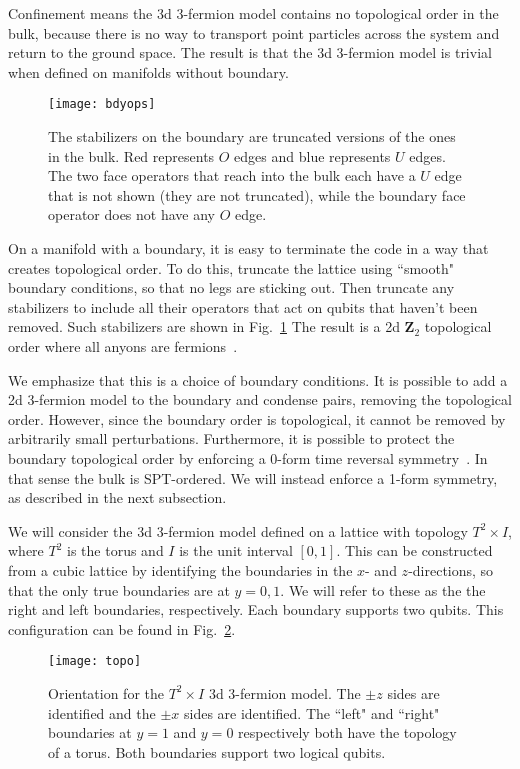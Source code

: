 Confinement means the 3d 3-fermion model contains no topological order in the bulk, because there is no way to transport point particles across the system and return to the ground space. The result is that the 3d 3-fermion model is trivial when defined on manifolds without boundary.

\begin{figure}[th!]
\centering
\texttt{[image: bdyops]}
\caption[Stabilizers on the boundary of the Walker-Wang model]{The stabilizers on the boundary are truncated versions of the ones in the bulk. Red represents $O$ edges and blue represents $U$ edges. The two face operators that reach into the bulk each have a $U$ edge that is not shown (they are not truncated), while the boundary face operator does not have any $O$ edge.}
\label{fig:bdyops}
\end{figure}

On a manifold with a boundary, it is easy to terminate the code in a way that creates topological order. To do this, truncate the lattice using ``smooth" boundary conditions, so that no legs are sticking out. Then truncate any stabilizers to include all their operators that act on qubits that haven't been removed. Such stabilizers are shown in Fig.~\ref{fig:bdyops} The result is a 2d $\mathbf{Z}_2$ topological order where all anyons are fermions~\cite{Burnell2014Soluble}.

We emphasize that this is a choice of boundary conditions. It is possible to add a 2d 3-fermion model to the boundary and condense pairs, removing the topological order. However, since the boundary order is topological, it cannot be removed by arbitrarily small perturbations. Furthermore, it is possible to protect the boundary topological order by enforcing a 0-form time reversal symmetry~\cite{Burnell2014Soluble}. In that sense the bulk is SPT-ordered. We will instead enforce a 1-form symmetry, as described in the next subsection.
	
We will consider the 3d 3-fermion model defined on a lattice with topology $T^2\times I$, where $T^2$ is the torus and $I$ is the unit interval $[0,1]$. This can be constructed from a cubic lattice by identifying the boundaries in the $x$- and $z$-directions, so that the only true boundaries are at $y=0,1$. We will refer to these as the the right and left boundaries, respectively. Each boundary supports two qubits. This configuration can be found in Fig.~\ref{fig:topo}.

\begin{figure}
\centering
\texttt{[image: topo]}
\caption[Orientation for the $T^2\times I$ 3d 3-fermion model]{Orientation for the $T^2\times I$ 3d 3-fermion model. The $\pm z$ sides are identified and the $\pm x$ sides are identified. The ``left" and ``right" boundaries at $y=1$ and $y=0$ respectively both have the topology of a torus. Both boundaries support two logical qubits.}
\label{fig:topo}
\end{figure}

